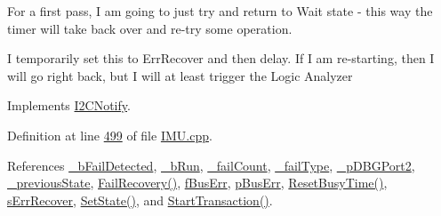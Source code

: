 For a first pass, I am going to just try and return to Wait state -\/ this way the timer will take back over and re-\/try some operation.

I temporarily set this to ErrRecover and then delay. If I am re-\/starting, then I will go right back, but I will at least trigger the Logic Analyzer 



Implements \hyperlink{class_i2_c_notify_a9b22fe2233f79a3e842145a6f1e4cc21}{I2CNotify}.



Definition at line \hyperlink{_i_m_u_8cpp_source_l00499}{499} of file \hyperlink{_i_m_u_8cpp_source}{IMU.cpp}.



References \hyperlink{_i_m_u_8h_source_l00110}{\_\-bFailDetected}, \hyperlink{_i_m_u_8h_source_l00107}{\_\-bRun}, \hyperlink{_i_m_u_8h_source_l00108}{\_\-failCount}, \hyperlink{_i_m_u_8h_source_l00087}{\_\-failType}, \hyperlink{_i_m_u_8h_source_l00113}{\_\-pDBGPort2}, \hyperlink{_i_m_u_8h_source_l00086}{\_\-previousState}, \hyperlink{_i_m_u_8cpp_source_l00398}{FailRecovery()}, \hyperlink{_i_m_u_8h_source_l00068}{fBusErr}, \hyperlink{_i_m_u_8h_source_l00060}{pBusErr}, \hyperlink{_i_m_u_8h_source_l00190}{ResetBusyTime()}, \hyperlink{_i_m_u_8h_source_l00051}{sErrRecover}, \hyperlink{_i_m_u_8h_source_l00178}{SetState()}, and \hyperlink{_i_m_u_8cpp_source_l00323}{StartTransaction()}.


